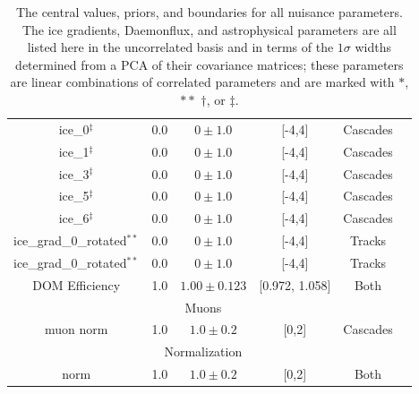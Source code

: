 \documentclass[main.tex]{subfiles}
\begin{document}
\begin{table}
\begin{tabular}{c | ccccc}
        ice\_0$^{\ddag}$ & 0.0 & $0\pm 1.0$ & [-4,4]&Cascades & \\
        ice\_1$^{\ddag}$ & 0.0 & $0\pm 1.0$ & [-4,4]&Cascades & \\
        ice\_3$^{\ddag}$ & 0.0 & $0\pm 1.0$ & [-4,4]&Cascades & \\
        ice\_5$^{\ddag}$ & 0.0 & $0\pm 1.0$ & [-4,4]&Cascades & \\
        ice\_6$^{\ddag}$ & 0.0 & $0\pm 1.0$ & [-4,4]&Cascades & \\
        ice\_grad\_0\_rotated$^{**}$ & 0.0 & $0\pm 1.0$ & [-4,4] & Tracks & \\
        ice\_grad\_0\_rotated$^{**}$ & 0.0 & $0\pm 1.0$ & [-4,4]& Tracks & \\
        DOM Efficiency & 1.0 & $1.00\pm0.123$ & [0.972, 1.058] & Both & \\
        \multicolumn{5}{c}{Muons} \\\hline
        muon norm & 1.0 & $1.0\pm0.2$ & [0,2] & Cascades & \\
        \multicolumn{5}{c}{Normalization} \\\hline
        norm & 1.0 & $1.0\pm0.2$ & [0,2] & Both & 
    \end{tabular}
    \caption{The central values, priors, and boundaries for all nuisance parameters. The ice gradients, Daemonflux, and astrophysical parameters are all listed here in the uncorrelated basis and in terms of the $1\sigma$ widths determined from a PCA of their covariance matrices; these parameters are linear combinations of correlated parameters and are marked with $*$,$**$ $\dag$, or $\ddag$.}\label{table:nutrition}
\end{table}
\end{document}
